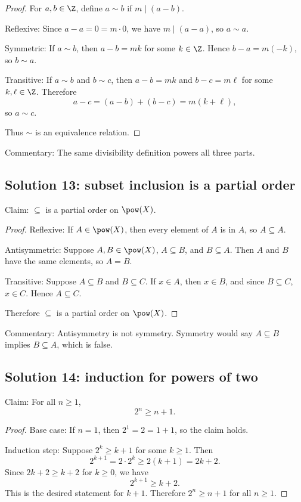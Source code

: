 \begin{proof}
For $a,b\in\Z$, define $a\sim b$ if $m\mid(a-b)$.

Reflexive: Since $a-a=0=m\cdot0$, we have $m\mid(a-a)$, so $a\sim a$.

Symmetric: If $a\sim b$, then $a-b=mk$ for some $k\in\Z$. Hence $b-a=m(-k)$, so $b\sim a$.

Transitive: If $a\sim b$ and $b\sim c$, then $a-b=mk$ and $b-c=m\ell$ for some $k,\ell\in\Z$. Therefore
\[
a-c=(a-b)+(b-c)=m(k+\ell),
\]
so $a\sim c$.

Thus $\sim$ is an equivalence relation.
\end{proof}

Commentary: The same divisibility definition powers all three parts.

\subsection{Solution 13: subset inclusion is a partial order}

Claim: $\subseteq$ is a partial order on $\pow(X)$.

\begin{proof}
Reflexive: If $A\in\pow(X)$, then every element of $A$ is in $A$, so $A\subseteq A$.

Antisymmetric: Suppose $A,B\in\pow(X)$, $A\subseteq B$, and $B\subseteq A$. Then $A$ and $B$ have the same elements, so $A=B$.

Transitive: Suppose $A\subseteq B$ and $B\subseteq C$. If $x\in A$, then $x\in B$, and since $B\subseteq C$, $x\in C$. Hence $A\subseteq C$.

Therefore $\subseteq$ is a partial order on $\pow(X)$.
\end{proof}

Commentary: Antisymmetry is not symmetry. Symmetry would say $A\subseteq B$ implies $B\subseteq A$, which is false.

\subsection{Solution 14: induction for powers of two}

Claim: For all $n\geq1$,
\[
2^n\geq n+1.
\]

\begin{proof}
Base case: If $n=1$, then $2^1=2=1+1$, so the claim holds.

Induction step: Suppose $2^k\geq k+1$ for some $k\geq1$. Then
\[
2^{k+1}=2\cdot2^k\geq2(k+1)=2k+2.
\]
Since $2k+2\geq k+2$ for $k\geq0$, we have
\[
2^{k+1}\geq k+2.
\]
This is the desired statement for $k+1$. Therefore $2^n\geq n+1$ for all $n\geq1$.
\end{proof}

